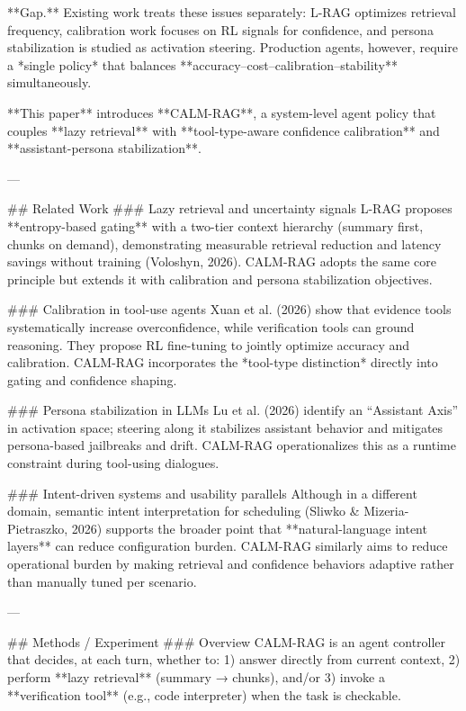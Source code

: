 **Gap.** Existing work treats these issues separately: L-RAG optimizes retrieval frequency, calibration work focuses on RL signals for confidence, and persona stabilization is studied as activation steering. Production agents, however, require a *single policy* that balances **accuracy–cost–calibration–stability** simultaneously.

**This paper** introduces **CALM-RAG**, a system-level agent policy that couples **lazy retrieval** with **tool-type-aware confidence calibration** and **assistant-persona stabilization**.

---

## Related Work  
### Lazy retrieval and uncertainty signals  
L-RAG proposes **entropy-based gating** with a two-tier context hierarchy (summary first, chunks on demand), demonstrating measurable retrieval reduction and latency savings without training (Voloshyn, 2026). CALM-RAG adopts the same core principle but extends it with calibration and persona stabilization objectives.

### Calibration in tool-use agents  
Xuan et al. (2026) show that evidence tools systematically increase overconfidence, while verification tools can ground reasoning. They propose RL fine-tuning to jointly optimize accuracy and calibration. CALM-RAG incorporates the *tool-type distinction* directly into gating and confidence shaping.

### Persona stabilization in LLMs  
Lu et al. (2026) identify an “Assistant Axis” in activation space; steering along it stabilizes assistant behavior and mitigates persona-based jailbreaks and drift. CALM-RAG operationalizes this as a runtime constraint during tool-using dialogues.

### Intent-driven systems and usability parallels  
Although in a different domain, semantic intent interpretation for scheduling (Sliwko & Mizeria-Pietraszko, 2026) supports the broader point that **natural-language intent layers** can reduce configuration burden. CALM-RAG similarly aims to reduce operational burden by making retrieval and confidence behaviors adaptive rather than manually tuned per scenario.

---

## Methods / Experiment  
### Overview  
CALM-RAG is an agent controller that decides, at each turn, whether to:  
1) answer directly from current context,  
2) perform **lazy retrieval** (summary → chunks), and/or  
3) invoke a **verification tool** (e.g., code interpreter) when the task is checkable.

